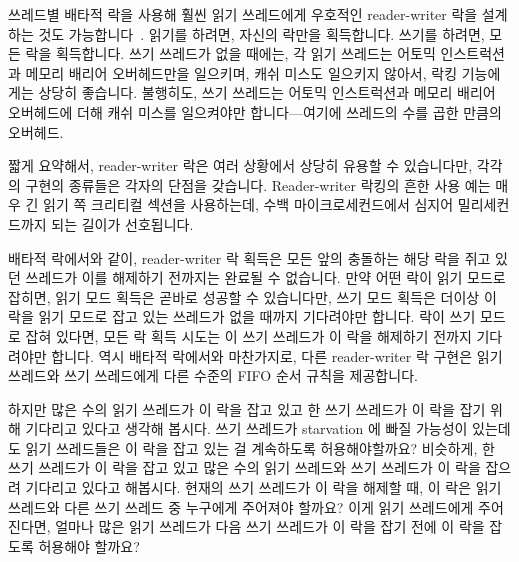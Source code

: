 \fi

쓰레드별 배타적 락을 사용해 훨씬 읽기 쓰레드에게 우호적인 reader-writer 락을
설계하는 것도 가능합니다~\cite{WilsonCHsieh92a}.
읽기를 하려면, 자신의 락만을 획득합니다.
쓰기를 하려면, 모든 락을 획득합니다.
쓰기 쓰레드가 없을 때에는, 각 읽기 쓰레드는 어토믹 인스트럭션과 메모리 배리어
오버헤드만을 일으키며, 캐쉬 미스도 일으키지 않아서, 락킹 기능에게는 상당히
좋습니다.
불행히도, 쓰기 쓰레드는 어토믹 인스트럭션과 메모리 배리어 오버헤드에 더해 캐쉬
미스를 일으켜야만 합니다---여기에 쓰레드의 수를 곱한 만큼의 오버헤드.

짧게 요약해서, reader-writer 락은 여러 상황에서 상당히 유용할 수 있습니다만,
각각의 구현의 종류들은 각자의 단점을 갖습니다.
Reader-writer 락킹의 흔한 사용 예는 매우 긴 읽기 쪽 크리티컬 섹션을 사용하는데,
수백 마이크로세컨드에서 심지어 밀리세컨드까지 되는 길이가 선호됩니다.

배타적 락에서와 같이, reader-writer 락 획득은 모든 앞의 충돌하는 해당 락을 쥐고
있던 쓰레드가 이를 해제하기 전까지는 완료될 수 없습니다.
만약 어떤 락이 읽기 모드로 잡히면, 읽기 모드 획득은 곧바로 성공할 수
있습니다만, 쓰기 모드 획득은 더이상 이 락을 읽기 모드로 잡고 있는 쓰레드가 없을
때까지 기다려야만 합니다.
락이 쓰기 모드로 잡혀 있다면, 모든 락 획득 시도는 이 쓰기 쓰레드가 이 락을
해제하기 전까지 기다려야만 합니다.
역시 배타적 락에서와 마찬가지로, 다른 reader-writer 락 구현은 읽기 쓰레드와
쓰기 쓰레드에게 다른 수준의 FIFO 순서 규칙을 제공합니다.

하지만 많은 수의 읽기 쓰레드가 이 락을 잡고 있고 한 쓰기 쓰레드가 이 락을 잡기
위해 기다리고 있다고 생각해 봅시다.
쓰기 쓰레드가 starvation 에 빠질 가능성이 있는데도 읽기 쓰레드들은 이 락을 잡고
있는 걸 계속하도록 허용해야할까요?
비슷하게, 한 쓰기 쓰레드가 이 락을 잡고 있고 많은 수의 읽기 쓰레드와 쓰기
쓰레드가 이 락을 잡으려 기다리고 있다고 해봅시다.
현재의 쓰기 쓰레드가 이 락을 해제할 때, 이 락은 읽기 쓰레드와 다른 쓰기 쓰레드
중 누구에게 주어져야 할까요?
이게 읽기 쓰레드에게 주어진다면, 얼마나 많은 읽기 쓰레드가 다음 쓰기 쓰레드가
이 락을 잡기 전에 이 락을 잡도록 허용해야 할까요?

